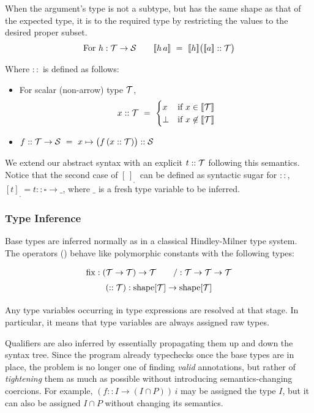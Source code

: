 When the argument's type is not a subtype, but has the same shape as that of the expected type,
it is  to the required type by restricting the values to the desired proper subset.
%
\[\mbox{For }h:\mathcal{T}\to\mathcal{S} \qquad [\![{h\,a}]\!] ~=~ [\![{h}]\!]\big([\![{a}]\!] :: \mathcal{T}\big)\]

Where $::$ is defined as follows:
\begin{itemize}
  \item For scalar (non-arrow) type $\mathcal{T}$, \[x :: \mathcal{T} ~=~ \begin{cases}x & \mbox{if }x\in[\![{\mathcal{T}}]\!] \\ \bot & \mbox{if }x\not\in[\![{\mathcal{T}}]\!]\end{cases}\]
  \item $f :: \mathcal{T}\to\mathcal{S} ~=~ x\mapsto \big(f\,(x :: \mathcal{T})\big) :: \mathcal{S}$
\end{itemize}

\medskip
We extend our abstract syntax with an explicit 
$t::\mathcal{T}$ following this semantics. Notice that the second case of $[\,]_{_\square}\,$
can be defined as syntactic sugar for $::$,
$[t]_{_\square} = t :: \square\to \_$, where $\_$ is a fresh
type variable to be inferred.

\subsubsection*{Type Inference}

Base types are inferred normally as in a classical Hindley-Milner type system.
The operators () behave like polymorphic
constants with the following types:
\[\renewcommand\arraystretch{1.5}
  \begin{array}{c}
    {\fix} : (\T\to\T)\to\T \qquad {/} : \T\to\T\to\T \\
    (::\T) : \mathrm{shape}[\T]\to\mathrm{shape}[\T]
  \end{array}\]

Any type variables occurring in type expressions are resolved at that
stage. In particular, it means that type variables are always assigned raw types.

Qualifiers are also inferred by essentially propagating them up and down the syntax tree.
Since the program already typechecks once the base types are in place, the problem is no longer
one of finding {\em valid} annotations, but rather of {\em tightening} them as much as possible
without introducing semantics-changing coercions. For example, $(f :: I\to(I\cap P))\,i$ may
be assigned the type $I$, but it can also be assigned $I\cap P$ without changing its semantics.

